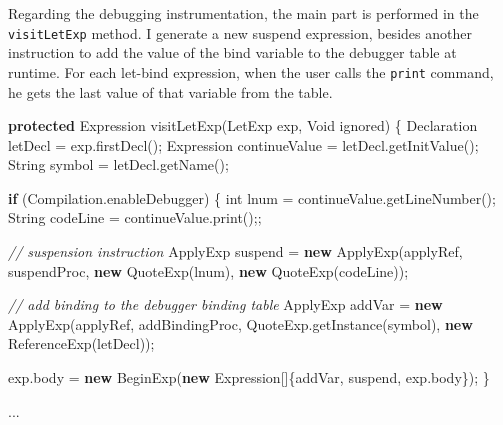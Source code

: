 \documentclass[12pt,a4paper,oneside,openright]{book}
\newenvironment{Shaded}{\begin{snugshade}}{\end{snugshade}}
\newcommand{\KeywordTok}[1]{\textcolor[rgb]{0.13,0.29,0.53}{\textbf{{#1}}}}
\newcommand{\DataTypeTok}[1]{\textcolor[rgb]{0.13,0.29,0.53}{{#1}}}
\newcommand{\CommentTok}[1]{\textcolor[rgb]{0.56,0.35,0.01}{\textit{{#1}}}}
\newcommand{\FunctionTok}[1]{\textcolor[rgb]{0.00,0.00,0.00}{{#1}}}
\newcommand{\NormalTok}[1]{{#1}}
\begin{document}
Regarding the debugging instrumentation, the main part is performed in
the \texttt{visitLetExp} method. I generate a new suspend expression,
besides another instruction to add the value of the bind variable to the
debugger table at runtime. For each let-bind expression, when the user
calls the \texttt{print} command, he gets the last value of that
variable from the table.

\begin{Shaded}
\begin{Highlighting}[]
\KeywordTok{protected} \NormalTok{Expression }\FunctionTok{visitLetExp}\NormalTok{(LetExp exp, Void ignored) \{}
    \NormalTok{Declaration letDecl = exp.}\FunctionTok{firstDecl}\NormalTok{();}
    \NormalTok{Expression continueValue = letDecl.}\FunctionTok{getInitValue}\NormalTok{();}
    \NormalTok{String symbol = letDecl.}\FunctionTok{getName}\NormalTok{();}

    \KeywordTok{if} \NormalTok{(Compilation.}\FunctionTok{enableDebugger}\NormalTok{) \{}
        \DataTypeTok{int} \NormalTok{lnum = continueValue.}\FunctionTok{getLineNumber}\NormalTok{();}
        \NormalTok{String codeLine = continueValue.}\FunctionTok{print}\NormalTok{();;}

        \CommentTok{// suspension instruction}
        \NormalTok{ApplyExp suspend = }\KeywordTok{new} \FunctionTok{ApplyExp}\NormalTok{(applyRef,}
                                       \NormalTok{suspendProc,}
                                       \KeywordTok{new} \FunctionTok{QuoteExp}\NormalTok{(lnum),}
                                       \KeywordTok{new} \FunctionTok{QuoteExp}\NormalTok{(codeLine));}

        \CommentTok{// add binding to the debugger binding table}
        \NormalTok{ApplyExp addVar = }\KeywordTok{new} \FunctionTok{ApplyExp}\NormalTok{(applyRef,}
                                       \NormalTok{addBindingProc,}
                                       \NormalTok{QuoteExp.}\FunctionTok{getInstance}\NormalTok{(symbol),}
                                       \KeywordTok{new} \FunctionTok{ReferenceExp}\NormalTok{(letDecl));}

        \NormalTok{exp.}\FunctionTok{body} \NormalTok{= }\KeywordTok{new} \FunctionTok{BeginExp}\NormalTok{(}\KeywordTok{new} \NormalTok{Expression[]\{addVar,}
                                                 \NormalTok{suspend,}
                                                 \NormalTok{exp.}\FunctionTok{body}\NormalTok{\});}
    \NormalTok{\}}

    \NormalTok{...}
\end{Highlighting}
\end{Shaded}
\end{document}
